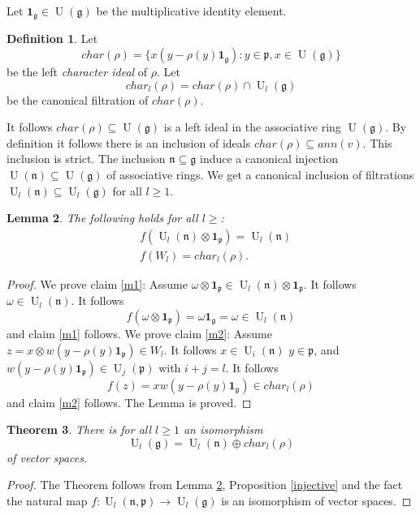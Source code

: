 \documentclass{amsart}
\theoremstyle{plain}
\newtheorem{theorem}{Theorem}[section]
\newtheorem{lemma}[theorem]{Lemma}
\theoremstyle{definition}
\newtheorem{definition}[theorem]{Definition}
\theoremstyle{remark}
\numberwithin{equation}{theorem}
\begin{document}
Let ${\mathbf{1}_{\mathfrak{g}}}\in {\operatorname{U}}({\mathfrak{g}})$ be the multiplicative identity element.
\begin{definition} Let 
\[ char(\rho)= \{x(y-\rho(y){\mathbf{1}_{\mathfrak{g}}}):y\in {\mathfrak{p}}, x\in {\operatorname{U}}({\mathfrak{g}}) \} \] 
be the left \emph{character ideal} of $\rho$. Let 
\[ char_l(\rho)=char(\rho)\cap {\operatorname{U}}_l({\mathfrak{g}}) \]
be the canonical filtration of $char(\rho)$.
\end{definition}
It follows $char(\rho)\subseteq {\operatorname{U}}({\mathfrak{g}})$ is a left ideal in the associative ring ${\operatorname{U}}({\mathfrak{g}})$.
By definition it follows there is an inclusion of ideals
$char(\rho)\subseteq ann(v)$. This inclusion is strict.
The inclusion ${\mathfrak{n}} \subseteq {\mathfrak{g}}$ induce a canonical injection
${\operatorname{U}}({\mathfrak{n}})\subseteq {\operatorname{U}}({\mathfrak{g}}) $ of associative rings. We get a canonical inclusion
of filtrations ${\operatorname{U}}_l({\mathfrak{n}})\subseteq {\operatorname{U}}_l({\mathfrak{g}})$ for all $l\geq 1$.

\begin{lemma} \label{inclusion} The following holds for all $l\geq $:
\begin{align}
&\label{m1}f({\operatorname{U}}_l({\mathfrak{n}})\otimes {\mathbf{1}_{\mathfrak{p}}})={\operatorname{U}}_l({\mathfrak{n}})\\
&\label{m2}f(W_l)=char_l(\rho).
\end{align}
\end{lemma}
\begin{proof} We prove claim \ref{m1}: Assume $\omega \otimes {\mathbf{1}_{\mathfrak{p}}}\in
  {\operatorname{U}}_l({\mathfrak{n}})\otimes {\mathbf{1}_{\mathfrak{p}}}$. It follows $\omega \in {\operatorname{U}}_l({\mathfrak{n}})$. It
  follows
\[ f(\omega \otimes {\mathbf{1}_{\mathfrak{p}}})=\omega {\mathbf{1}_{\mathfrak{g}}} =\omega \in {\operatorname{U}}_l({\mathfrak{n}}) \]
and claim \ref{m1} follows. We prove claim \ref{m2}: Assume 
$z=x\otimes w(y-\rho(y){\mathbf{1}_{\mathfrak{p}}})\in W_l$. It follows $x\in {\operatorname{U}}_i({\mathfrak{n}})$
$y\in {\mathfrak{p}}$, and $w(y-\rho(y){\mathbf{1}_{\mathfrak{p}}})\in {\operatorname{U}}_j({\mathfrak{p}})$ with $i+j=l$. It
follows
\[ f(z)=xw(y-\rho(y){\mathbf{1}_{\mathfrak{g}}})\in char_l(\rho) \]
and claim \ref{m2} follows. The Lemma is proved.
\end{proof}

\begin{theorem} \label{directsum} There is for all $l\geq 1$ an isomorphism
\[ {\operatorname{U}}_l({\mathfrak{g}})={\operatorname{U}}_l({\mathfrak{n}})\oplus char_l(\rho) \]
of vector spaces.
\end{theorem}
\begin{proof} The Theorem follows from Lemma \ref{inclusion},
  Proposition \ref{injective} and the
  fact the natural map $f:{\operatorname{U}}_l({\mathfrak{n}},{\mathfrak{p}})\rightarrow {\operatorname{U}}_l({\mathfrak{g}})$ is an
  isomorphism of vector spaces.
\end{proof}
\end{document}
